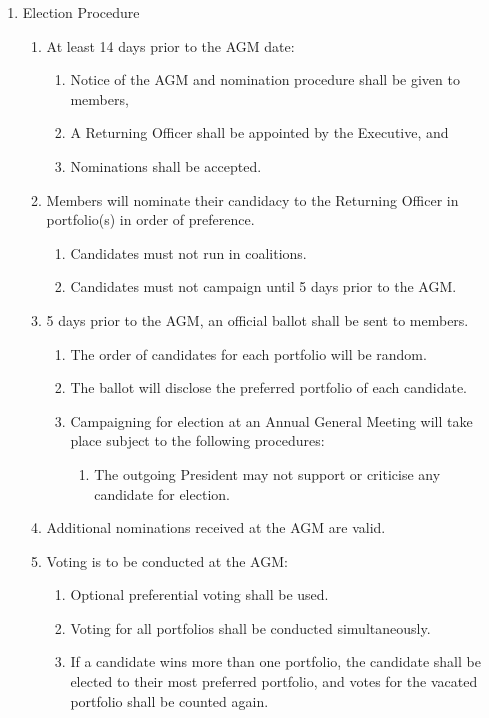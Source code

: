 \begin{enumerate}
\item Election Procedure
  \begin{enumerate}
  \item At least 14 days prior to the AGM date:
    \begin{enumerate}
    \item Notice of the AGM and nomination procedure shall be given to members,
    \item A Returning Officer shall be appointed by the Executive, and
    \item Nominations shall be accepted.
    \end{enumerate}
  \item Members will nominate their candidacy to the Returning Officer in portfolio(s) in order of preference.
  \begin{enumerate}
    \item Candidates must not run in coalitions.
    \item Candidates must not campaign until 5 days prior to the AGM.
  \end{enumerate}
  \item 5 days prior to the AGM, an official ballot shall be sent to members.
    \begin{enumerate}
    \item The order of candidates for each portfolio will be random.
    \item The ballot will disclose the preferred portfolio of each candidate.
    \item Campaigning for election at an Annual General Meeting will take place subject to the following procedures:
      \begin{enumerate}
      \item The outgoing President may not support or criticise any candidate for election.
      \end{enumerate}
    \end{enumerate}
  \item Additional nominations received at the AGM are valid.
  \item Voting is to be conducted at the AGM:
    \begin{enumerate}
    \item Optional preferential voting shall be used.
    \item Voting for all portfolios shall be conducted simultaneously.
    \item If a candidate wins more than one portfolio, the candidate shall be elected to their most preferred portfolio, and votes for the vacated portfolio shall be counted again.
    \end{enumerate}
  \end{enumerate}


\end{enumerate}
